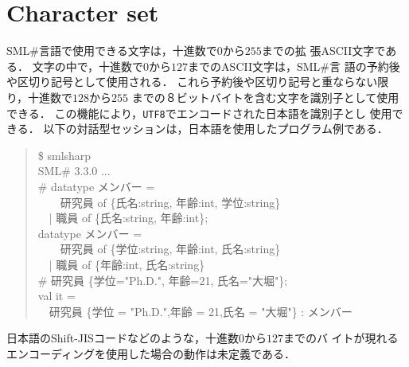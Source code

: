 \documentclass{jbook}
\newcommand{\txt}[2]{#2}
\newcommand{\smlsharp}{SML\#}
\newcommand{\version}{3.3.0}
\newcommand{\code}[1]{\mbox{\large\tt #1}}
\newcommand{\myem}{\mbox{\ \ }}
\newenvironment{program}{\begin{quote}\begin{tt}}%
                        {\end{tt}\end{quote}}
\begin{document}
\section{\txt{文字集合}{Character set}}
\ifjp%
	\smlsharp{}言語で使用できる文字は，十進数で$0$から$255$までの拡
張ASCII文字である．
	文字の中で，十進数で$0$から$127$までのASCII文字は，\smlsharp{}言
語の予約後や区切り記号として使用される．
	これら予約後や区切り記号と重ならない限り，十進数で$128$から$255$
までの８ビットバイトを含む文字を識別子として使用できる．
	この機能により，\code{UTF8}でエンコードされた日本語を識別子とし
使用できる．
	以下の対話型セッションは，日本語を使用したプログラム例である．
\begin{program}
  \$ smlsharp\\
  SML\# \version{} ...\\
  \# datatype メンバー = 
\\
   \myem\myem  研究員 of \{氏名:string, 年齢:int, 学位:string\} 
\\
   \myem | 職員 of \{氏名:string, 年齢:int\};
\\
  datatype メンバー =
\\
   \myem\myem 研究員 of \{学位:string, 年齢:int, 氏名:string\}
\\
  \myem | 職員 of \{年齢:int, 氏名:string\}
\\
  \# 研究員 \{学位="Ph.D.", 年齢=21, 氏名="大堀"\};
\\
  val it =
\\
  \myem 研究員 \{学位 = "Ph.D.",年齢 = 21,氏名 = "大堀"\} : メンバー
\end{program}
	日本語のShift-JISコードなどのような，十進数$0$から$127$までのバ
イトが現れるエンコーディングを使用した場合の動作は未定義である．
	
\end{document}
